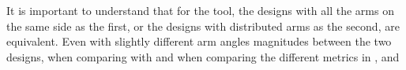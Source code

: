 It is important to understand that for the tool, the designs with all the arms
on the same side as the first, or the designs with distributed arms as
the second, are equivalent. Even with slightly different arm angles magnitudes
between the two designs, when comparing with
 and when comparing the different metrics
in ,  and
\begin{figure}[!h]
\end{figure}
